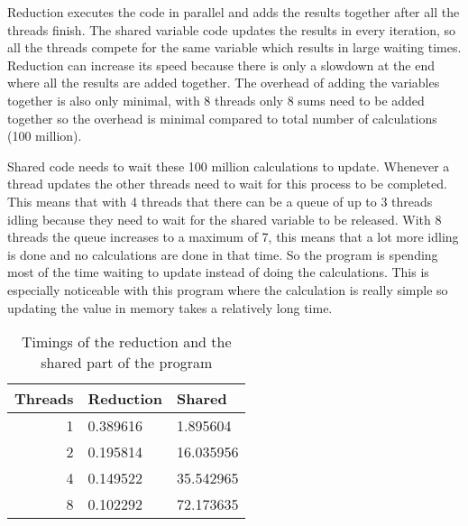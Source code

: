 \documentclass[a4paper]{article}
\begin{document}
\begin{enumerate}[(a)]
	Reduction executes the code in parallel and adds the results together after all the threads finish. The shared variable code updates the results in every iteration, so all the threads compete for the same variable which results in large waiting times. Reduction can increase its speed because there is only a slowdown at the end where all the results are added together. The overhead of adding the variables together is also only minimal, with 8 threads only 8 sums need to be added together so the overhead is minimal compared to total number of calculations (100 million).
	
	Shared code needs to wait these 100 million calculations to update. Whenever a thread updates the other threads need to wait for this process to be completed. This means that with 4 threads that there can be a queue of up to 3 threads idling because they need to wait for the shared variable to be released. With 8 threads the queue increases to a maximum of 7, this means that a lot more idling is done and no calculations are done in that time. So the program is spending most of the time waiting to update instead of doing the calculations. This is especially noticeable with this program where the calculation is really simple so updating the value in memory takes a relatively long time.
\end{enumerate}

\begin{table}
	\centering
	\caption{Timings of the reduction and the shared part of the program}
	\label{tbl:shared}
	\begin{tabular}{r|l|l}
		Threads & Reduction & Shared \\ \hline
		1 & 0.389616 & 1.895604 \\
		2 & 0.195814 & 16.035956 \\
		4 & 0.149522 & 35.542965 \\
		8 & 0.102292 & 72.173635
	\end{tabular}
\end{table}
\end{document}
